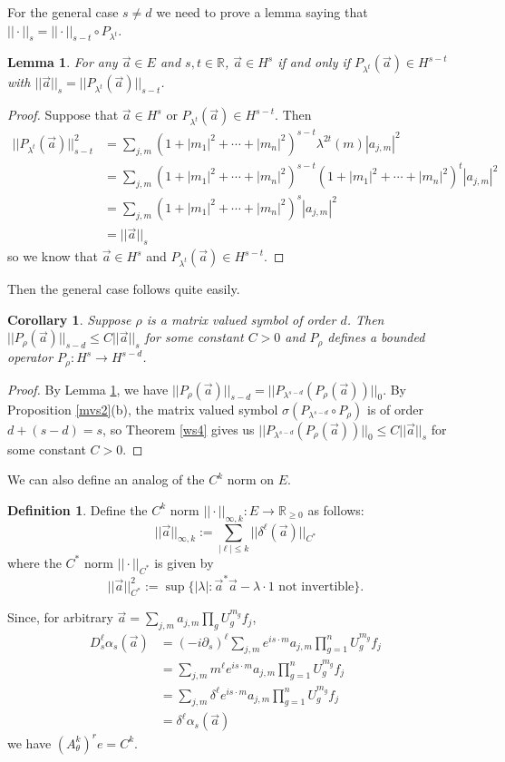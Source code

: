 \documentclass[10pt]{article}
\newtheorem{cor}[thm]{Corollary}
\newtheorem{lem}[thm]{Lemma}
\theoremstyle{remark}
\theoremstyle{definition}
\newtheorem{define}[thm]{Definition}
\begin{document}
For the general case $s\ne d$ we need to prove a lemma saying that
$||\cdot||_s=||\cdot||_{s-t}\circ P_{\lambda^t}$.
\begin{lem}\label{swn4}
For any $\vec{a}\in E$ and $s,t\in\mathbb R$,
$\vec{a}\in H^s$ if and only if
$P_{\lambda^t}(\vec{a})\in H^{s-t}$
with $||\vec{a}||_s=||P_{\lambda^t}(\vec{a})||_{s-t}$.
\end{lem}
\begin{proof}
Suppose that $\vec{a}\in H^s$ or $P_{\lambda^t}(\vec{a})\in H^{s-t}$. Then
\begin{align*}
||P_{\lambda^t}(\vec{a})||_{s-t}^2
&= \sum_{j,m}(1+|m_1|^2+\cdots+|m_n|^2)^{s-t}\lambda^{2t}(m)|a_{j,m}|^2 \\
&= \sum_{j,m}(1+|m_1|^2+\cdots+|m_n|^2)^{s-t}(1+|m_1|^2+\cdots+|m_n|^2)^t
|a_{j,m}|^2 \\
&= \sum_{j,m}(1+|m_1|^2+\cdots+|m_n|^2)^s|a_{j,m}|^2 \\
&= ||\vec{a}||_s
\end{align*}
so we know that $\vec{a}\in H^s$ and $P_{\lambda^t}(\vec{a})\in H^{s-t}$.
\end{proof}
Then the general case follows quite easily.
\begin{cor}
Suppose $\rho$ is a matrix valued symbol of order $d$.
Then $||P_{\rho}(\vec{a})||_{s-d}\le C||\vec{a}||_s$ for
some constant $C>0$ and $P_{\rho}$ defines a bounded operator
$P_{\rho}:H^s\rightarrow H^{s-d}$.
\end{cor}
\begin{proof}
By Lemma \ref{swn4}, we have
$||P_{\rho}(\vec{a})||_{s-d}=||P_{\lambda^{s-d}}(P_{\rho}(\vec{a}))||_0$.
By Proposition \ref{mvs2}(b), the matrix valued symbol
$\sigma(P_{\lambda^{s-d}}\circ P_{\rho})$ is of order $d+(s-d)=s$,
so Theorem \ref{ws4} gives us
$||P_{\lambda^{s-d}}(P_{\rho}(\vec{a}))||_0\le C||\vec{a}||_s$
for some constant $C>0$.
\end{proof}
We can also define an analog of the $C^k$ norm on $E$.
\begin{define}
Define the $C^k$ norm
$||\cdot||_{\infty,k}:E\rightarrow\mathbb R_{\ge 0}$
as follows:
$$||\vec{a}||_{\infty,k}:=\sum_{|\ell|\le k}||\delta^{\ell}(\vec{a})||_{C^*}$$
where the $C^*$ norm $||\cdot||_{C^*}$ is given by
$$||\vec{a}||_{C^*}^2
:=\sup\{|\lambda|:\vec{a}^*\vec{a}-\lambda\cdot 1\text{ not invertible}\}.$$
\end{define}
Since, for arbitrary $\vec{a}=\sum_{j,m}a_{j,m}\prod_gU_g^{m_g}f_j$,
\begin{align*}
D_s^{\ell}\alpha_s(\vec{a})
&=(-i\partial_s)^{\ell}\sum_{j,m}e^{is\cdot m}a_{j,m}
\prod_{g=1}^nU_g^{m_g}f_j \\
&=\sum_{j,m}m^{\ell}e^{is\cdot m}a_{j,m}\prod_{g=1}^nU_g^{m_g}f_j \\
&=\sum_{j,m}\delta^{\ell}e^{is\cdot m}a_{j,m}\prod_{g=1}^nU_g^{m_g}f_j \\
&=\delta^{\ell}\alpha_s(\vec{a})
\end{align*}
we have $(A_{\theta}^k)^re=C^k$.
\end{document}
